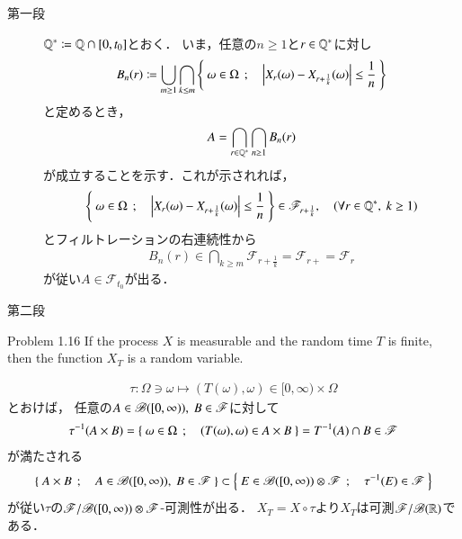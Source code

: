 \begin{prf}\mbox{}
	\begin{description}
		\item[第一段]
			$\mathbb{Q}^* \coloneqq \mathbb{Q} \cap [0,t_0]$とおく．
			いま，任意の$n \geq 1$と$r \in \mathbb{Q}^*$に対し
			\begin{align}
				B_n (r) \coloneqq
				\bigcup_{m \geq 1} \bigcap_{k \leq m} 
				\left\{\ \omega \in \Omega\ \, ; \quad \left| X_r(\omega)-X_{r+\frac{1}{k}}(\omega) \right| \leq \frac{1}{n}\ \right\}
			\end{align}
			と定めるとき，
			\begin{align}
				A = \bigcap_{r \in \mathbb{Q}^*} \bigcap_{n \geq 1} B_n(r)
			\end{align}
			が成立することを示す．これが示されれば，
			\begin{align}
				\left\{\ \omega \in \Omega\ \, ; \quad \left| X_r(\omega)-X_{r+\frac{1}{k}}(\omega) \right| \leq \frac{1}{n}\ \right\}
				\in \mathscr{F}_{r+\frac{1}{k}},
				\quad (\forall r \in \mathbb{Q}^*,\ k \geq 1)
			\end{align}
			とフィルトレーションの右連続性から
			\begin{align}
				B_n (r) \in \bigcap_{k \geq m} \mathscr{F}_{r+\frac{1}{k}} = \mathscr{F}_{r+} = \mathscr{F}_{r}
			\end{align}
			が従い$A \in \mathscr{F}_{t_0}$が出る．
		
		\item[第二段]
			
	\end{description}
\end{prf}

\begin{itembox}[l]{Problem 1.16}
	If the process $X$ is measurable and the random time $T$ is finite, 
	then the function $X_T$ is a random variable.
\end{itembox}

\begin{prf}
	\begin{align}
		\tau:\Omega \ni \omega \longmapsto (T(\omega),\omega) \in [0,\infty) \times \Omega
	\end{align}
	とおけば，
	任意の$A \in \mathscr{B}([0,\infty)),\ B \in \mathscr{F}$に対して
	\begin{align}
		\tau^{-1}(A \times B) = \left\{\ \omega \in \Omega\ \, ; \quad (T(\omega),\omega) \in A \times B\ \right\}
		= T^{-1}(A) \cap B \in \mathscr{F}
	\end{align}
	が満たされる
	\begin{align}
		\left\{\ A \times B\ \, ; \quad A \in \mathscr{B}([0,\infty)),\ B \in \mathscr{F}\ \right\}
		\subset \left\{\ E \in \mathscr{B}([0,\infty)) \otimes \mathscr{F}\ \, ; \quad \tau^{-1}(E) \in \mathscr{F}\ \right\}
	\end{align}
	が従い$\tau$の$\mathscr{F}/\mathscr{B}([0,\infty)) \otimes \mathscr{F}$-可測性が出る．
	$X_T = X \circ \tau$より$X_T$は可測$\mathscr{F}/\mathscr{B}(\mathbb{R})$である．
	\QED
\end{prf}

